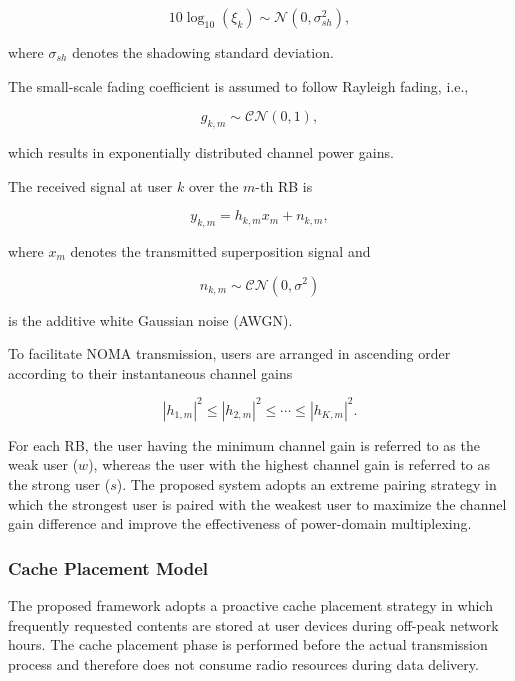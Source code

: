 \documentclass[12pt,a4paper]{article}
\begin{document}
\begin{equation}
10\log_{10}(\xi_k)\sim\mathcal{N}(0,\sigma_{sh}^2),
\end{equation}

where $\sigma_{sh}$ denotes the shadowing standard deviation.

The small-scale fading coefficient is assumed to follow Rayleigh fading, i.e.,

\begin{equation}
g_{k,m}\sim\mathcal{CN}(0,1),
\end{equation}

which results in exponentially distributed channel power gains.

The received signal at user $k$ over the $m$-th RB is

\begin{equation}
y_{k,m}
=
h_{k,m}x_m+n_{k,m},
\label{eq:received_signal}
\end{equation}

where $x_m$ denotes the transmitted superposition signal and

\begin{equation}
n_{k,m}\sim\mathcal{CN}(0,\sigma^2)
\end{equation}

is the additive white Gaussian noise (AWGN).

To facilitate NOMA transmission, users are arranged in ascending order according to their instantaneous channel gains

\begin{equation}
|h_{1,m}|^2
\le
|h_{2,m}|^2
\le
\cdots
\le
|h_{K,m}|^2.
\label{eq:ordering}
\end{equation}

For each RB, the user having the minimum channel gain is referred to as the weak user ($w$), whereas the user with the highest channel gain is referred to as the strong user ($s$). The proposed system adopts an extreme pairing strategy in which the strongest user is paired with the weakest user to maximize the channel gain difference and improve the effectiveness of power-domain multiplexing.

\subsubsection{Cache Placement Model}

The proposed framework adopts a proactive cache placement strategy in which frequently requested contents are stored at user devices during off-peak network hours. The cache placement phase is performed before the actual transmission process and therefore does not consume radio resources during data delivery.
\end{document}

